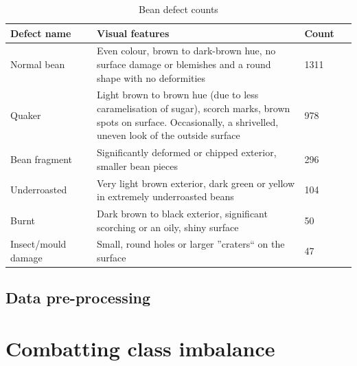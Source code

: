 \begin{table}[h]
	\centering
	\begin{tabular}{|p{0.25\linewidth}|p{0.6\linewidth}|p{0.15\linewidth}|}
		\toprule \textbf{Defect name} & \textbf{Visual features}                                                                                                                                             & \textbf{Count} \\
		\midrule Normal bean          & Even colour, brown to dark-brown hue, no surface damage or blemishes and a round shape with no deformities                                                           & 1311           \\
		Quaker                        & Light brown to brown hue (due to less caramelisation of sugar), scorch marks, brown spots on surface. Occasionally, a shrivelled, uneven look of the outside surface & 978            \\
		Bean fragment                 & Significantly deformed or chipped exterior, smaller bean pieces                                                                                                      & 296            \\
		Underroasted                  & Very light brown exterior, dark green or yellow in extremely underroasted beans                                                                                      & 104            \\
		Burnt                         & Dark brown to black exterior, significant scorching or an oily, shiny surface                                                                                        & 50             \\
		Insect/mould damage           & Small, round holes or larger ''craters`` on the surface                                                                                                              & 47             \\
		\bottomrule
	\end{tabular}
	\caption{Bean defect counts}
	\label{tab:beanDefectCounts}
\end{table}

\subsection{Data pre-processing}
\label{subsec:data-pre-processing}

\section{Combatting class imbalance}
\label{sec:combatting-class-imbalance}


